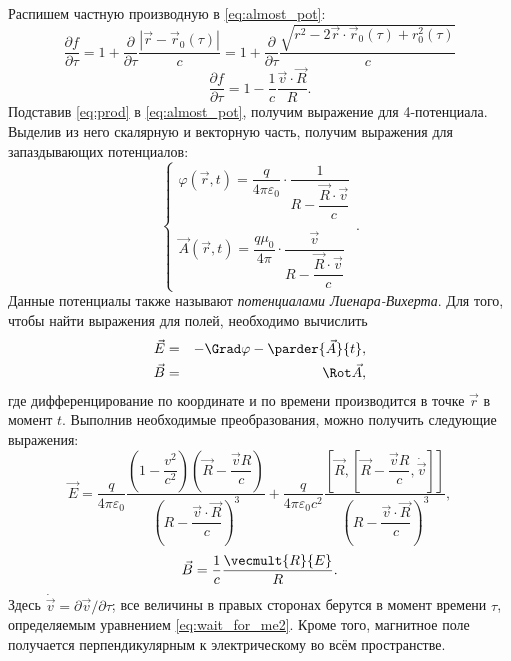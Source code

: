 Распишем частную производную в \eqref{eq:almost_pot}:
\begin{equation*}
\frac{\partial f}{\partial \tau} = 1 + \frac{\partial}{\partial \tau} \frac{\left| \vec{r} - \vec{r}_0(\tau) \right|}{c} = 1 + \frac{\partial}{\partial \tau} \frac{ \sqrt{r^2 - 2\vec{r} \cdot \vec{r}_0 (\tau) + r_0^2(\tau)} }{c}
\end{equation*}
\begin{equation}
\frac{\partial f}{\partial \tau} = 1 - \frac{1}{c} \frac{\vec{v} \cdot \vec{R}}{R}.
\label{eq:prod}
\end{equation}
Подставив \eqref{eq:prod} в \eqref{eq:almost_pot}, получим выражение для 4-потенциала. Выделив из него скалярную и векторную часть, получим выражения для запаздывающих потенциалов:
\begin{equation}
\begin{cases}
\varphi (\vec{r},t) = \dfrac{q}{4 \pi \varepsilon_0} \cdot \dfrac{1}{R - \dfrac{\vec{R} \cdot \vec{v}}{c}} \\ \\
\vec{A} (\vec{r}, t) = \dfrac{q \mu_0}{4 \pi} \cdot \dfrac{\vec{v}}{R - \dfrac{\vec{R} \cdot \vec{v}}{c}}
\end{cases}.
\end{equation}
Данные потенциалы также называют \textit{потенциалами Лиенара-Вихерта}. Для того, чтобы найти выражения для полей, необходимо вычислить
\begin{eqnarray}
\vec{E} &=& - \Grad \varphi - \parder{\vec{A}}{t}, \\
\vec{B} &=& \Rot \vec{A},
\end{eqnarray}
где дифференцирование по координате и по времени производится в точке $\vec{r}$ в момент $t$. Выполнив необходимые преобразования, можно получить следующие выражения:
\begin{equation}
\vec{E} = \dfrac{q}{4 \pi \varepsilon_0} \dfrac{\left( 1 - \dfrac{v^2}{c^2} \right) \left( \vec{R} - \dfrac{\vec{v} R}{c}  \right) }{\left( R - \dfrac{\vec{v} \cdot \vec{ R}}{c} \right)^3} + \dfrac{q}{4 \pi \varepsilon_0 c^2} \dfrac{\left[ \vec{R} , \left[ \vec{R} - \dfrac{\vec{v}R}{c} , \dot{\vec{v}}  \right]  \right]}{\left( R - \dfrac{\vec{v} \cdot \vec{ R}}{c} \right)^3},
\label{eq:opt_LV_E_early2}
\end{equation}
\begin{equation}
\vec{B} = \frac{1}{c} \frac{\vecmult{R}{E}}{R}.
\label{eq:opt_LV_B_early2}
\end{equation}
Здесь $\dot{\vec{v}} = \partial \vec{v} / \partial \tau$; все величины в правых сторонах берутся в момент времени $\tau$, определяемым уравнением \eqref{eq:wait_for_me2}. Кроме того, магнитное поле получается перпендикулярным к электрическому во всём пространстве.




